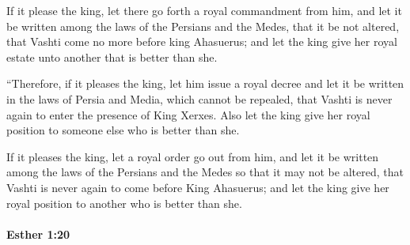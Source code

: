 			\begin{versebox}
					\item[BHS] 
					\item[LXX] 
					\item[ASV] If it please the king, let there go forth a royal commandment from him, and let it be written among the laws of the Persians and the Medes, that it be not altered, that Vashti come no more before king Ahasuerus; and let the king give her royal estate unto another that is better than she.
					\item[NIV] “Therefore, if it pleases the king, let him issue a royal decree and let it be written in the laws of Persia and Media, which cannot be repealed, that Vashti is never again to enter the presence of King Xerxes. Also let the king give her royal position to someone else who is better than she.
					\item[NRSV] If it pleases the king, let a royal order go out from him, and let it be written among the laws of the Persians and the Medes so that it may not be altered, that Vashti is never again to come before King Ahasuerus; and let the king give her royal position to another who is better than she.
			\end{versebox}

		\paragraph{Esther 1:20} %
			\label{ESTHER-1-20}

